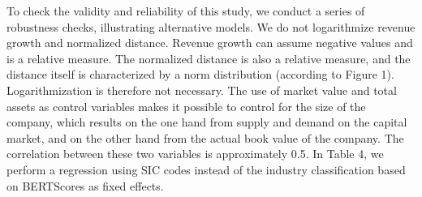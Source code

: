 \documentclass[
]{article}
\begin{document}
To check the validity and reliability of this study, we conduct a series
of robustness checks, illustrating alternative models. We do not
logarithmize revenue growth and normalized distance. Revenue growth can
assume negative values and is a relative measure. The normalized
distance is also a relative measure, and the distance itself is
characterized by a norm distribution (according to Figure 1).
Logarithmization is therefore not necessary. The use of market value and
total assets as control variables makes it possible to control for the
size of the company, which results on the one hand from supply and
demand on the capital market, and on the other hand from the actual book
value of the company. The correlation between these two variables is
approximately 0.5. In Table 4, we perform a regression using SIC codes
instead of the industry classification based on BERTScores as fixed
effects.
\end{document}
